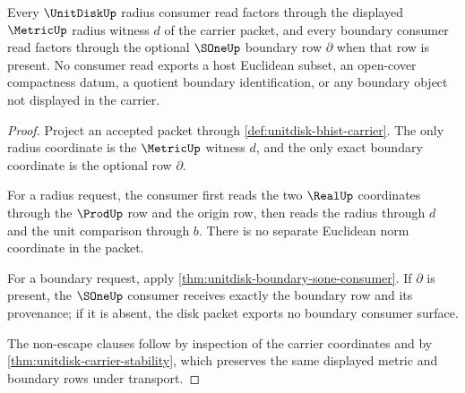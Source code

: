 \begin{theorem}
\label{thm:unitdisk-radius-boundary-exactness}
Every $\UnitDiskUp$ radius consumer read factors through the displayed $\MetricUp$ radius witness $d$ of the carrier packet, and every boundary consumer read factors through the optional $\SOneUp$ boundary row $\partial$ when that row is present. No consumer read exports a host Euclidean subset, an open-cover compactness datum, a quotient boundary identification, or any boundary object not displayed in the carrier.
\end{theorem}
\begin{proof}
Project an accepted packet through \autoref{def:unitdisk-bhist-carrier}. The only radius coordinate is the $\MetricUp$ witness $d$, and the only exact boundary coordinate is the optional row $\partial$.

For a radius request, the consumer first reads the two $\RealUp$ coordinates through the $\ProdUp$ row and the origin row, then reads the radius through $d$ and the unit comparison through $b$. There is no separate Euclidean norm coordinate in the packet.

For a boundary request, apply \autoref{thm:unitdisk-boundary-sone-consumer}. If $\partial$ is present, the $\SOneUp$ consumer receives exactly the boundary row and its provenance; if it is absent, the disk packet exports no boundary consumer surface.

The non-escape clauses follow by inspection of the carrier coordinates and by \autoref{thm:unitdisk-carrier-stability}, which preserves the same displayed metric and boundary rows under transport.
\end{proof}

